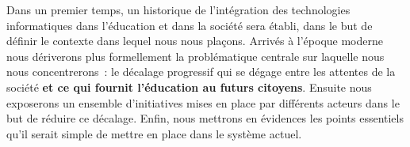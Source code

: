 Dans un premier temps, un historique de l'intégration des technologies informatiques dans l'éducation et dans la société sera établi, dans le but de définir le contexte dans lequel nous nous plaçons. Arrivés à l'époque moderne nous dériverons plus formellement la problématique centrale sur laquelle nous nous concentrerons~: le décalage progressif qui se dégage entre les attentes de la société \textbf{et ce qui fournit l'éducation au futurs citoyens}. Ensuite nous exposerons un ensemble d'initiatives mises en place par différents acteurs dans le but de réduire ce décalage. Enfin, nous mettrons en évidences les points essentiels qu'il serait simple de mettre en place dans le système actuel.
